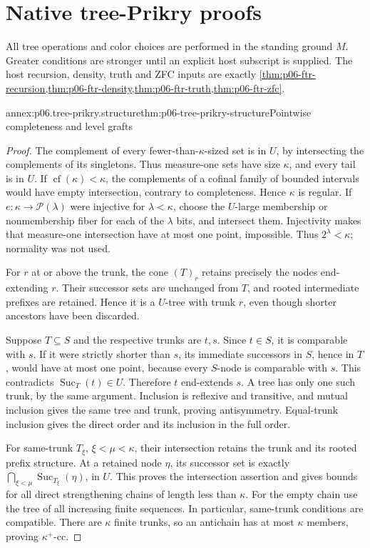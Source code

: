 \section{Native tree-Prikry proofs}
\label{annex:p06-tree-prikry-forcing}

All tree operations and color choices are performed in the standing
ground \(M\). Greater conditions are stronger until an explicit host
subscript is supplied.
The host recursion, density, truth and ZFC inputs are exactly
\cref{thm:p06-ftr-recursion,thm:p06-ftr-density,thm:p06-ftr-truth,thm:p06-ftr-zfc}.

\begin{annexitem}{annex:p06.tree-prikry.structure}{thm:p06-tree-prikry-structure}{Pointwise completeness and level grafts}
\begin{proof}
The complement of every fewer-than-\(\kappa\)-sized set is in \(U\),
by intersecting the complements of its singletons. Thus measure-one
sets have size \(\kappa\), and every tail is in \(U\). If
\(\operatorname{cf}(\kappa)<\kappa\), the complements of a cofinal
family of bounded intervals would have empty intersection, contrary to
completeness. Hence \(\kappa\) is regular. If
\(e:\kappa\to\mathcal P(\lambda)\) were injective for
\(\lambda<\kappa\), choose the \(U\)-large membership or nonmembership
fiber for each of the \(\lambda\) bits, and intersect them. Injectivity
makes that measure-one intersection have at most one point, impossible.
Thus \(2^\lambda<\kappa\); normality was not used.

For \(r\) at or above the trunk, the cone \((T)_r\) retains precisely
the nodes end-extending \(r\). Their successor sets are unchanged
from \(T\), and rooted intermediate prefixes are retained. Hence
it is a \(U\)-tree with trunk \(r\), even though shorter ancestors
have been discarded.

Suppose \(T\subseteq S\) and the respective trunks are \(t,s\).
Since \(t\in S\), it is comparable with \(s\). If it were strictly
shorter than \(s\), its immediate successors in \(S\), hence in
\(T\), would have at most one point, because every \(S\)-node is
comparable with \(s\). This contradicts \(\operatorname{Suc}_T(t)\in U\).
Therefore \(t\) end-extends \(s\). A tree has only one such trunk,
by the same argument. Inclusion is reflexive and transitive, and mutual
inclusion gives the same tree and trunk, proving antisymmetry. Equal-trunk
inclusion gives the direct order and its inclusion in the full order.

For same-trunk \(T_\xi\), \(\xi<\mu<\kappa\), their intersection
retains the trunk and its rooted prefix structure. At a retained node
\(\eta\), its successor set is exactly
\(\bigcap_{\xi<\mu}\operatorname{Suc}_{T_\xi}(\eta)\), in \(U\).
This proves the intersection assertion and gives bounds for all direct
strengthening chains of length less than \(\kappa\). For the empty
chain use the tree of all increasing finite sequences. In particular,
same-trunk conditions are compatible. There are \(\kappa\) finite
trunks, so an antichain has at most \(\kappa\) members, proving
\(\kappa^+\)-cc.


\end{proof}
\end{annexitem}
